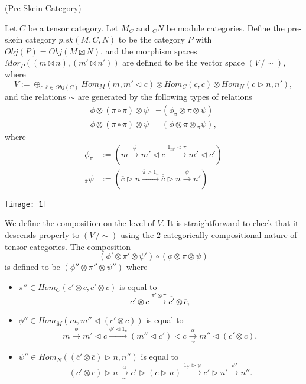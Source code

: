 \begin{definition} (Pre-Skein Category)

  \noindent Let $C$ be a tensor category. Let $M_{C}$ and $ _{C}N$ be module
  categories. \quad Define the pre-skein category $p.sk(M,C,N)$ to be the
  category $P$ with $Obj(P) = Obj(M \boxtimes N)$, and the morphism spaces
  $Mor_{P}((m \boxtimes n), (m' \boxtimes n'))$ are defined to be the vector space
  $(V \,/ \sim)$, where
  \[
    V := \oplus_{c,\overline{c} \in Obj(C)} Hom_{M}(m, m' \lhd c) \otimes Hom_{C}(c,\overline{c}) \otimes Hom_{N} (\overline{c} \rhd n, n'),
  \]
  and the relations $\sim$ are generated by the following types of relations
  \begin{align}
    \phi \otimes (\overline{\pi} \circ \pi) \otimes \psi &- (\phi_{\pi} \otimes \overline{\pi} \otimes \psi) \label{relation/a} \\
    \phi \otimes (\overline{\pi} \circ \pi) \otimes \psi &- (\phi \otimes \pi \otimes {}_{\overline{\pi}}\psi) \label{relation/b},
  \end{align}
  where
  \begin{align}
    \phi_{\pi}  &:= \left( m \xrightarrow{\phi} m' \lhd c \xrightarrow{1_{m'} \lhd \pi} m' \lhd c' \right)\\
    {}_{\overline{\pi}}\psi &:= \left( \overline{c} \rhd n \xrightarrow{\overline{\pi} \rhd 1_{n}} \overline{\overline{c}} \rhd n \xrightarrow{\psi} n' \right)
  \end{align}

  \begin{center}
    \texttt{[image: 1]}
  \end{center}

  \noindent We define the composition on the level of $V$. It is
  straightforward to check that it descends properly to $(V \, / \sim)$ using
  the $2$-categorically compositional nature of tensor categories.
  The composition
  \[
    (\phi' \otimes \pi' \otimes \psi' ) \circ (\phi \otimes \pi \otimes \psi)
  \]
  is defined to be $(\phi'' \otimes \pi'' \otimes \psi'')$ where
  \begin{itemize}
    \item
    $\pi'' \in Hom_{C}(c' \otimes c, \overline{c}' \otimes \overline{c})$ is equal to
    \[
      c' \otimes c \xrightarrow{\pi' \otimes \pi} \overline{c'} \otimes \overline{c},
    \]
    \item
    \noindent $\phi'' \in Hom_{M}(m, m'' \lhd (c' \otimes c))$ is equal to
    \[
      m \xrightarrow{\phi} m' \lhd c \xrightarrow{\phi' \lhd 1_{c}} (m'' \lhd c') \lhd c \xrightarrow[\sim]{\alpha} m'' \lhd (c' \otimes c),
    \]
    \item
    \noindent $\psi'' \in Hom_{N}((\overline{c}' \otimes \overline{c}) \rhd n, n'')$ is equal to
    \[
      (\overline{c}' \otimes \overline{c}) \rhd n \xrightarrow[\sim]{\alpha} \overline{c}' \rhd (\overline{c} \rhd n) \xrightarrow{1_{\overline{c}'} \rhd \psi} \overline{c}' \rhd n' \xrightarrow{\psi'} n''.
    \]
  \end{itemize}


\end{definition}
